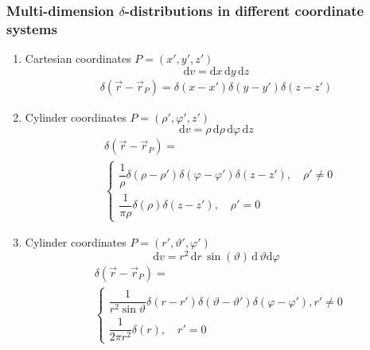 \subsubsection{Multi-dimension $\delta$-distributions in different coordinate systems}
\begin{enumerate}
\item Cartesian coordinates $P=(x',y',z')$
        \begin{equation*}
          \mathrm{d}v = \mathrm{d}x\,\mathrm{d}y\,\mathrm{d}z
        \end{equation*}
        \begin{align*}
          \delta(\vec{r}-\vec{r}_{P}) = \delta(x-x')\delta(y-y')\delta(z-z')
        \end{align*}
\item Cylinder coordinates $P=(\rho',\varphi',z')$
        \begin{equation*}
          \mathrm{d}v = \rho\,\mathrm{d}\rho\,\mathrm{d}\varphi\,\mathrm{d}z
        \end{equation*}
        \begin{align*}
          &\delta(\vec{r}-\vec{r}_{P}) =\\
          &\begin{cases}
            \dfrac{1}{\rho}\delta(\rho-\rho')\delta(\varphi-\varphi')\delta(z-z'), \quad \rho'\neq0\\
            \dfrac{1}{\pi\rho}\delta(\rho)\delta(z-z'), \quad \rho'=0
          \end{cases}
        \end{align*}
\item Cylinder coordinates $P=(r',\vartheta',\varphi')$
        \begin{equation*}
          \mathrm{d}v = r^{2}\,\mathrm{d}r\,\sin(\vartheta)\,\mathrm{d}\,\vartheta\mathrm{d}\varphi
        \end{equation*}
        \begin{align*}
          &\delta(\vec{r}-\vec{r}_{P}) =\\
          &\begin{cases}
            \dfrac{1}{r^{2}\sin\vartheta}\delta(r-r')\delta(\vartheta-\vartheta')\delta(\varphi-\varphi'),r'\neq0\\
            \dfrac{1}{2\pi r^{2}}\delta(r), \quad r'=0
          \end{cases}
        \end{align*}
\end{enumerate}
